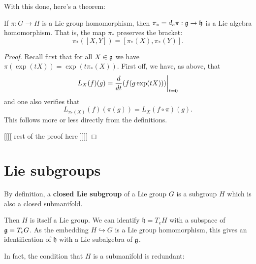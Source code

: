 \documentclass[11pt, english]{article}
\begin{document}
With this done, here's a theorem:

\begin{thm}
If $\pi:G \to H$ is a Lie group homomorphism, then $\pi_\ast= d_e \pi: \mathfrak g \to \mathfrak h$ is a Lie algebra homomorphism. That is, the map $\pi_\ast$ preserves the bracket:
$$
\pi_\ast([X,Y]) = [\pi_\ast(X), \pi_\ast(Y)].
$$
\end{thm}
\begin{proof}
Recall first that for all $X \in \mathfrak g$ we have $\pi(\exp(t X)) = \exp(t \pi_\ast (X))$. First off, we have, as above, that
$$
L_X(f)(g) = \restr{ \frac{d}{dt} (f(g \exp(tX)))}{t=0}
$$
and one also verifies that
$$
L_{\pi_\ast(X)} (f) (\pi(g)) = L_X(f \circ \pi)(g).
$$
This follows more or less directly from the definitions. 

[[[[ rest of the proof here ]]]]
\end{proof}



\newpage
\section{Lie subgroups}

By definition, a \textbf{closed Lie subgroup} of a Lie group $G$ is a subgroup $H$ which is also a closed submanifold. 

Then $H$ is itself a Lie group. We can identify $\mathfrak h = T_e H$ with a subspace of $\mathfrak g = T_eG$. As the embedding $H \hookrightarrow G$ is a Lie group homomorphism, this gives an identification of $\mathfrak h$ with a Lie subalgebra of $\mathfrak g$. 

In fact, the condition that $H$ is a submanifold is redundant:
\end{document}
